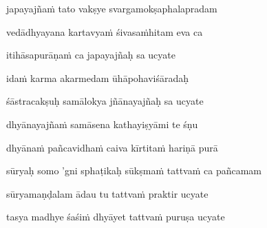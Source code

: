japayajñaṁ tato vakṣye svargamokṣaphalapradam\thinspace{\dandab} \dontdisplaylinenum

vedādhyayana kartavyaṁ śivasaṁhitam eva ca \veg\dontdisplaylinenum
{}

itihāsapurāṇaṁ ca japayajñaḥ sa ucyate\thinspace{\dandab} \dontdisplaylinenum



idaṁ karma akarmedam ūhāpohaviśāradaḥ \veg\dontdisplaylinenum
{}

śāstracakṣuḥ samālokya jñānayajñaḥ sa ucyate\thinspace{\dandab} \dontdisplaylinenum

dhyānayajñaṁ samāsena kathayiṣyāmi te śṇu \veg\dontdisplaylinenum



dhyānaṁ pañcavidhaṁ caiva kīrtitaṁ hariṇā purā\thinspace{\dandab} \dontdisplaylinenum

sūryaḥ somo 'gni sphaṭikaḥ sūkṣmaṁ tattvaṁ ca pañcamam \veg\dontdisplaylinenum
{}

sūryamaṇḍalam ādau tu tattvaṁ praktir ucyate\thinspace{\dandab} \dontdisplaylinenum

tasya madhye śaśiṁ dhyāyet tattvaṁ puruṣa ucyate \veg\dontdisplaylinenum
{}

